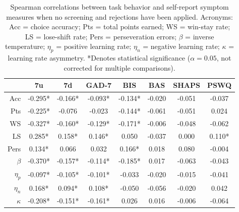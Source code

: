 \documentclass[a4paper,notitlepage,12pt]{article}
\begin{document}
\begin{table}[h!]
\centering
\small
\begin{tabular}{rccccccc}
\toprule
{} &       7u &       7d &    GAD-7 &      BIS &     BAS &   SHAPS &    PSWQ \\
\midrule
Acc      &  -0.295* &  -0.166* &  -0.093* &  -0.134* &  -0.020 &  -0.051 &  -0.037 \\
Pts      &  -0.225* &   -0.076 &   -0.023 &  -0.144* &  -0.061 &  -0.051 &   0.024 \\
WS       &  -0.327* &  -0.160* &  -0.129* &  -0.171* &  -0.006 &  -0.048 &  -0.062 \\
LS       &   0.285* &   0.158* &   0.146* &    0.050 &  -0.037 &   0.000 &  0.110* \\
Pers     &   0.134* &    0.066 &    0.032 &   0.166* &   0.018 &   0.080 &  -0.004 \\
$\beta$  &  -0.370* &  -0.157* &  -0.114* &  -0.185* &   0.017 &  -0.063 &  -0.043 \\
$\eta_p$ &  -0.097* &  -0.105* &  -0.101* &   -0.033 &  -0.020 &  -0.015 &  -0.041 \\
$\eta_n$ &   0.168* &   0.094* &   0.108* &   -0.050 &  -0.056 &  -0.020 &   0.042 \\
$\kappa$ &  -0.208* &  -0.151* &  -0.161* &    0.026 &   0.016 &  -0.006 &  -0.064 \\
\bottomrule
\end{tabular}
\captionsetup{width=0.88\textwidth}
\caption{Spearman correlations between task behavior and self-report symptom measures when no screening and rejections have been applied. Acronyms: Acc = choice accuracy; Pts = total points earned; WS = win-stay rate; LS = lose-shift rate; Pers = perseveration errors; $\beta$ = inverse temperature; $\eta_p$ = positive learning rate; $\eta_n$ = negative learning rate; $\kappa$ = learning rate asymmetry. *Denotes statistical significance ($\alpha=0.05$, not corrected for multiple comparisons).}
\end{table}
\end{document}

